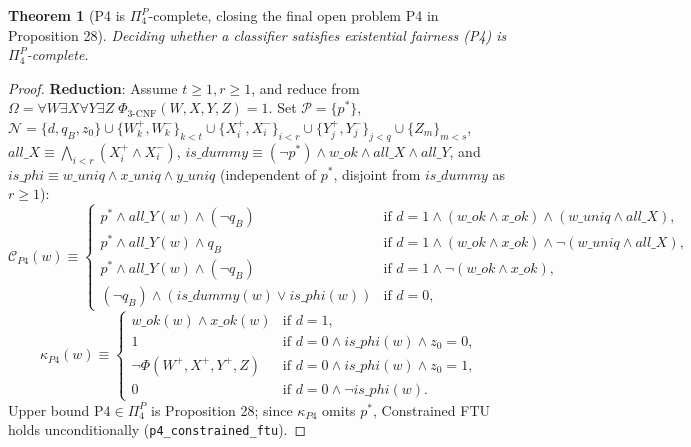 \documentclass[11pt,a4paper]{article}
\newtheorem{theorem}{Theorem}[section]
\newcommand{\C}{\mathcal{C}}
\newcommand{\N}{\mathcal{N}}
\newcommand{\Prot}{\mathcal{P}}
\newcommand{\code}[1]{\texttt{\small #1}}
\begin{document}
\begin{theorem}[P4 is $\Pi_4^P$-complete, closing the final open problem P4 in Proposition 28]
Deciding whether a classifier satisfies existential fairness (P4) is $\Pi_4^P$-complete.
\end{theorem}
\begin{proof}
\textbf{Reduction}: Assume $t \ge 1, r \ge 1$, and reduce from $\Omega = \forall W \exists X \forall Y \exists Z\;\Phi_{\text{3-CNF}}(W,X,Y,Z)=1$. Set $\Prot = \{p^*\}$, $\N = \{d, q_B, z_0\} \cup \{W_k^+,W_k^-\}_{k<t} \cup \{X_i^+,X_i^-\}_{i<r} \cup \{Y_j^+,Y_j^-\}_{j<q} \cup \{Z_m\}_{m<s}$, $all\_X \equiv \bigwedge_{i<r}(X_i^+ \land X_i^-)$, $is\_dummy \equiv (\neg p^*) \land w\_ok \land all\_X \land all\_Y$, and $is\_phi \equiv w\_uniq \land x\_uniq \land y\_uniq$ (independent of $p^*$, disjoint from $is\_dummy$ as $r \ge 1$):
{\small
\[
  \C_{P4}(w) \equiv \begin{cases}
    p^* \land all\_Y(w) \land (\neg q_B) & \text{if } d=1 \land (w\_ok \land x\_ok) \land (w\_uniq \land all\_X),\\
    p^* \land all\_Y(w) \land q_B & \text{if } d=1 \land (w\_ok \land x\_ok) \land \neg(w\_uniq \land all\_X),\\
    p^* \land all\_Y(w) \land (\neg q_B) & \text{if } d=1 \land \neg(w\_ok \land x\_ok),\\
    (\neg q_B) \land (is\_dummy(w) \lor is\_phi(w)) & \text{if } d=0,
  \end{cases}
\]
}
\[
  \kappa_{P4}(w) \equiv \begin{cases}
    w\_ok(w) \land x\_ok(w) & \text{if } d=1,\\
    1 & \text{if } d=0 \land is\_phi(w) \land z_0=0,\\
    \neg\Phi(W^+, X^+, Y^+, Z) & \text{if } d=0 \land is\_phi(w) \land z_0=1,\\
    0 & \text{if } d=0 \land \neg is\_phi(w).
  \end{cases}
\]
Upper bound $\mathrm{P4} \in \Pi_4^P$ is Proposition 28; since $\kappa_{P4}$ omits $p^*$, Constrained FTU holds unconditionally (\code{p4\_constrained\_ftu}).


\end{proof}
\end{document}
